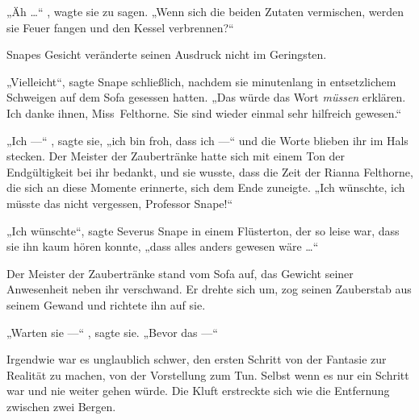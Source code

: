 „Äh …“ , wagte sie zu sagen.
„Wenn sich die beiden Zutaten vermischen, werden sie Feuer fangen und den Kessel verbrennen?“

Snapes Gesicht veränderte seinen Ausdruck nicht im Geringsten.

„Vielleicht“, sagte Snape schließlich, nachdem sie minutenlang in entsetzlichem Schweigen auf dem Sofa gesessen hatten.
„Das würde das Wort \emph{müssen} erklären. Ich danke ihnen, Miss~Felthorne. Sie sind wieder einmal sehr hilfreich gewesen.“

„Ich —“ , sagte sie, „ich bin froh, dass ich —“ und die Worte blieben ihr im Hals stecken. Der Meister der Zaubertränke hatte sich mit einem Ton der Endgültigkeit bei ihr bedankt, und sie wusste, dass die Zeit der Rianna Felthorne, die sich an diese Momente erinnerte, sich dem Ende zuneigte.
„Ich wünschte, ich müsste das nicht vergessen, Professor Snape!“

„Ich wünschte“, sagte Severus Snape in einem Flüsterton, der so leise war, dass sie ihn kaum hören konnte, „dass alles anders gewesen wäre …“

Der Meister der Zaubertränke stand vom Sofa auf, das Gewicht seiner Anwesenheit neben ihr verschwand. Er drehte sich um, zog seinen Zauberstab aus seinem Gewand und richtete ihn auf sie.

„Warten sie —“ , sagte sie.
„Bevor das —“

Irgendwie war es unglaublich schwer, den ersten Schritt von der Fantasie zur Realität zu machen, von der Vorstellung zum Tun. Selbst wenn es nur ein Schritt war und nie weiter gehen würde. Die Kluft erstreckte sich wie die Entfernung zwischen zwei Bergen.

